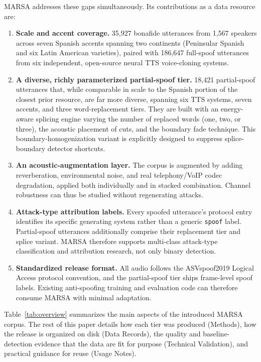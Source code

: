 \documentclass[11pt]{article}
\begin{document}
MARSA addresses these gaps simultaneously. Its contributions as a data resource are:
\begin{enumerate}
  \item \textbf{Scale and accent coverage.} 35{,}927 bonafide
  utterances from 1{,}567 speakers across seven Spanish accents spanning
  two continents (Peninsular Spanish and six Latin American varieties),
  paired with 186{,}647 full-spoof utterances from six independent,
  open-source neural TTS voice-cloning systems.
  \item \textbf{A diverse, richly parameterized partial-spoof tier.}
  18{,}421 partial-spoof utterances that, while comparable in scale to
  the Spanish portion of the closest prior resource, are far more
  diverse, spanning six TTS systems, seven accents, and three
  word-replacement tiers. They are built with an energy-aware splicing
  engine varying the number of replaced words (one, two, or three),
  the acoustic placement of cuts, and the boundary fade technique. This boundary-homogenization variant is explicitly designed to
  suppress splice-boundary detector shortcuts.
  \item \textbf{An acoustic-augmentation layer.} The corpus is augmented by adding reverberation,
  environmental noise, and real telephony/VoIP codec degradation, applied
  both individually and in stacked combination. Channel robustness can thus be studied without regenerating
  attacks.
  \item \textbf{Attack-type attribution labels.} Every spoofed
  utterance's protocol entry identifies its specific generating system
  rather than a generic \texttt{spoof} label. Partial-spoof utterances
  additionally comprise their replacement tier and splice variant. MARSA
  therefore supports multi-class attack-type classification and
  attribution research, not only binary detection.
  \item \textbf{Standardized release format.} All audio follows the
  ASVspoof2019 Logical Access protocol convention, and the partial-spoof
  tier ships frame-level spoof labels. Existing anti-spoofing training
  and evaluation code can therefore consume MARSA with minimal
  adaptation.
\end{enumerate}

Table~\ref{tab:overview} summarizes the main aspects of the introduced MARSA corpus. The rest of this
paper details how each tier was produced (Methods), how the release
is organized on disk (Data Records), the quality and baseline-detection
evidence that the data are fit for purpose (Technical Validation), and
practical guidance for reuse (Usage Notes).
\end{document}
